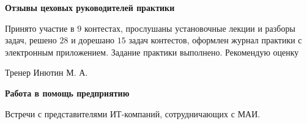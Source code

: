 \begin{center}
    \bfseries{\large Отзывы цеховых руководителей практики}
    \end{center}
    
    Принято участие в $9$ контестах, прослушаны установочные лекции и разборы задач, решено $28$ и дорешано $15$ задач контестов, оформлен журнал практики с электронным приложением. Задание практики выполнено. Рекомендую оценку
    
    \vspace{15pt}
    
    \hfill Тренер Инютин М. А. 
    
    \vspace{200pt}
    
    \begin{center}
    \bfseries{\large Работа в помощь предприятию}
    \end{center}
    
    Встречи с представителями ИТ-компаний, сотрудничающих с МАИ.
    
    \pagebreak